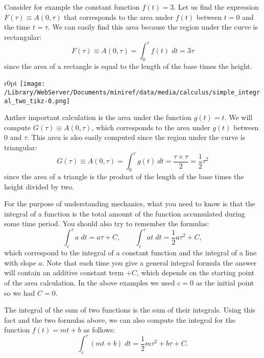 \documentclass[letterpaper,9pt,journal]{IEEEtran}
\newcommand{\be}{\begin{equation}}
\newcommand{\ee}{\end{equation}}
\begin{document}
Consider for example the constant function $f(t)=3$.
Let us find the expression $F(\tau)\equiv A(0,\tau)$
that corresponds to the area under $f(t)$ between 
$t=0$ and the time $t=\tau$.
We can easily find this area because the region under the curve is rectangular:
\[ 
 \! F(\tau) \equiv A(0,\tau) =  \! \int_0^\tau \!\! f(t)\;dt  = 3 \tau
\]
since the area of a rectangle is equal to the length of the base times the height.


\begin{wrapfigure}{r}{0pt}
\texttt{[image: /Library/WebServer/Documents/miniref/data/media/calculus/simple\_integral\_two\_tikz-0.png]}
\end{wrapfigure}

Anther important calculation is the area under 
the function $g(t)=t$. We will compute $G(\tau)\equiv A(0,\tau)$,
which corresponds to the area under $g(t)$ between $0$ and $\tau$.
This area is also easily computed since the region under the curve 
is triangular:
\[
 G(\tau) \!\equiv \!A(0,\tau) \!=\!\! \int_0^\tau \!\!\!g(t) \: dt \!= \!\frac{\tau\times\tau}{2} \!= \!\frac{1}{2}\tau^2
\]
since the area of a triangle is the product of the length of
the base times the height divided by two.


%

For the purpose of understanding mechanics,
what you need to know is that the integral of a function is the total amount of the function accumulated during some time period. 
You should also try to remember the formulas:
\[
 \int_c^\tau a \;dt = a\tau + C, \qquad 
 \int_c^\tau at \;dt = \frac{1}{2}a\tau^2 + C,
\]
which correspond to the integral of a constant function
and the integral of a line with slope $a$.
Note that each time you give a general integral formula
the answer will contain an additive constant term $+C$,
which depends on the starting point of the area calculation. 
In the above examples we used $c=0$ as the initial
point so we had $C=0$.

The integral of the sum of two functions is the sum of their integrals.
Using this fact and the two formulas above, 
we can also compute the integral for the function $f(t)=mt+b$ as follows:
\be
  \int_c^\tau (mt + b)\;dt 
 = \frac{1}{2}m\tau^2 + b \tau  + C.
  \label{integral-formula}
\ee
\end{document}
